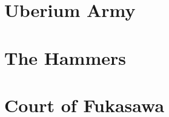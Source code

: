 



\frontmatter
\maketitle
\tableofcontents

\mainmatter%
\section{Uberium Army}


\clearpage\section{The Hammers}


\clearpage\section{Court of Fukasawa}

